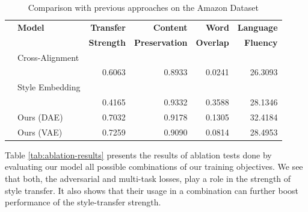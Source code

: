 \begin{table}[ht]
	\centering
	\begin{tabular}{| c | l | r | r | r | r |}
		\hline
		\multirow{2}{*}{} & \textbf{Model}        & \textbf{Transfer} & \textbf{Content}      & \textbf{Word}    & \textbf{Language} \\
		                  &                       & \textbf{Strength} & \textbf{Preservation} & \textbf{Overlap} & \textbf{Fluency}  \\
		\hline
		\hline
		\multirow{2}{*}{} & Cross-Alignment       &                   &                       &                  &                   \\
		                  & \citep{shen2017style} & 0.6063            & 0.8933                & 0.0241           & 26.3093           \\
		\hline
		\multirow{2}{*}{} & Style Embedding       &                   &                       &                  &                   \\
		                  & \citep{fu2017style}   & 0.4165            & 0.9332                & 0.3588           & 28.1346           \\
		\hline
		                  & Ours (DAE)            & 0.7032            & 0.9178                & 0.1305           & 32.4184           \\
		\hline
		                  & Ours (VAE)            & 0.7259            & 0.9090                & 0.0814           & 28.4953           \\
		\hline
	\end{tabular}
	\caption{Comparison with previous approaches on the Amazon Dataset}
	\label{tab:comparison-previous-ama}
\end{table}


Table \ref{tab:ablation-results} presents the results of ablation tests done by evaluating our model all possible combinations of our training objectives. We see that both, the adversarial and multi-task losses, play a role in the strength of style transfer. It also shows that their usage in a combination can further boost performance of the style-transfer strength.

